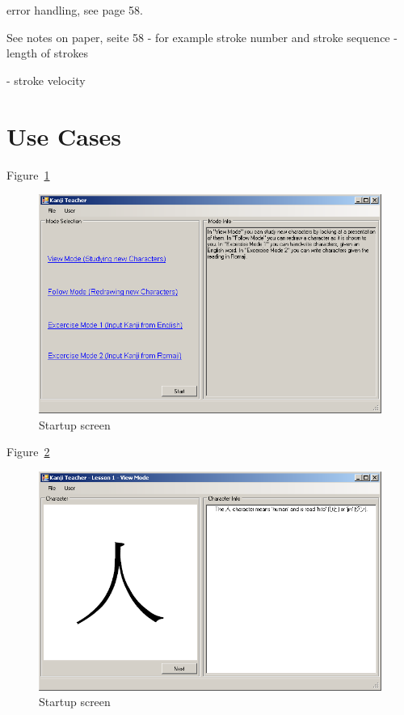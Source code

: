 error handling, see page 58.


See notes on paper, seite 58
- for example stroke number and stroke sequence
- length of strokes

- stroke velocity

\section{Use Cases}
\label{sec:concept:usecases}

Figure~\ref{fig:startupScreen}
\begin{figure}[htbp]
\begin{center}
\includegraphics[scale=0.7]{images/ConceptualDesign/startupScreen.png}
\caption{Startup screen}
\label{fig:startupScreen}
\end{center}
\end{figure}

Figure~\ref{fig:viewMode}
\begin{figure}[htbp]
\begin{center}
\includegraphics[scale=0.7]{images/ConceptualDesign/viewMode.png}
\caption{Startup screen}
\label{fig:viewMode}
\end{center}
\end{figure}

